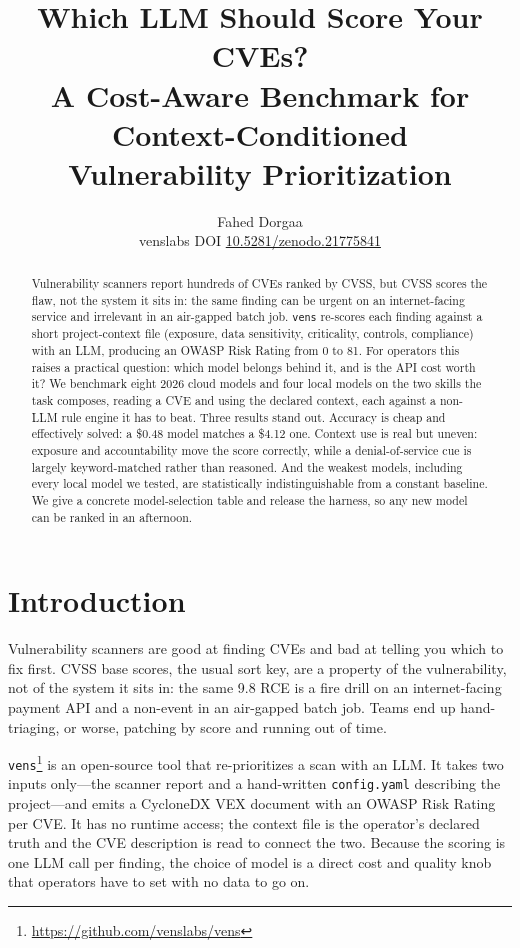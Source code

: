 \documentclass[10pt,twocolumn]{article}
\title{\vspace{-3ex}\textbf{Which LLM Should Score Your CVEs?}\\
\large A Cost-Aware Benchmark for Context-Conditioned\\ Vulnerability Prioritization}
\author{Fahed Dorgaa\\\small venslabs \;\textbar\; \code{github.com/venslabs/vens-benchmark} \;\textbar\; DOI \href{https://doi.org/10.5281/zenodo.21775841}{10.5281/zenodo.21775841}}
\date{}
\newcommand{\code}[1]{\texttt{\small #1}}
\begin{document}
\maketitle

\begin{abstract}
\noindent
Vulnerability scanners report hundreds of CVEs ranked by CVSS, but CVSS scores
the flaw, not the system it sits in: the same finding can be urgent on an
internet-facing service and irrelevant in an air-gapped batch job. \code{vens}
re-scores each finding against a short project-context file (exposure, data
sensitivity, criticality, controls, compliance) with an LLM, producing an OWASP
Risk Rating from 0 to 81. For operators this raises a practical question: which
model belongs behind it, and is the API cost worth it? We benchmark eight 2026
cloud models and four local models on the two skills the task composes, reading
a CVE and using the declared context, each against a non-LLM rule engine it has
to beat. Three results stand out. Accuracy is cheap and effectively solved: a
\$0.48 model matches a \$4.12 one. Context use is real but uneven: exposure and
accountability move the score correctly, while a denial-of-service cue is
largely keyword-matched rather than reasoned. And the weakest models, including
every local model we tested, are statistically indistinguishable from a constant
baseline. We give a concrete model-selection table and release the harness, so
any new model can be ranked in an afternoon.
\end{abstract}

\section{Introduction}
Vulnerability scanners are good at finding CVEs and bad at telling you which to
fix first. CVSS base scores, the usual sort key, are a property of the
vulnerability, not of the system it sits in: the same 9.8 RCE is a fire drill on
an internet-facing payment API and a non-event in an air-gapped batch job. Teams
end up hand-triaging, or worse, patching by score and running out of time.

\code{vens}\footnote{\url{https://github.com/venslabs/vens}} is an
open-source tool that re-prioritizes a scan with an LLM. It takes two inputs
only---the scanner report and a hand-written \code{config.yaml} describing the
project---and emits a CycloneDX VEX document with an OWASP Risk Rating per CVE.
It has no runtime access; the context file is the operator's declared truth and
the CVE description is read to connect the two. Because the scoring is one LLM
call per finding, the choice of model is a direct cost and quality knob that
operators have to set with no data to go on.
\end{document}
